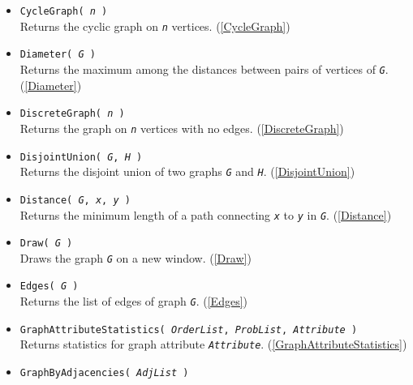\documentclass[a4paper,11pt]{report}
\begin{document}
{{\begin{itemize}
 Returns the equivalence partition of $V(G)$ corresponding to the equivalence relation ``reachable'' in \mbox{\texttt{\mdseries\slshape G}}. (\ref{ConnectedComponents}) 
\item \texttt{CycleGraph( \mbox{\texttt{\mdseries\slshape n}} )}\\
 Returns the cyclic graph on \mbox{\texttt{\mdseries\slshape n}} vertices. (\ref{CycleGraph}) 
\item \texttt{Diameter( \mbox{\texttt{\mdseries\slshape G}} )}\\
 Returns the maximum among the distances between pairs of vertices of \mbox{\texttt{\mdseries\slshape G}}. (\ref{Diameter}) 
\item \texttt{DiscreteGraph( \mbox{\texttt{\mdseries\slshape n}} )}\\
 Returns the graph on \mbox{\texttt{\mdseries\slshape n}} vertices with no edges. (\ref{DiscreteGraph}) 
\item \texttt{DisjointUnion( \mbox{\texttt{\mdseries\slshape G}}, \mbox{\texttt{\mdseries\slshape H}} )}\\
 Returns the disjoint union of two graphs \mbox{\texttt{\mdseries\slshape G}} and \mbox{\texttt{\mdseries\slshape H}}. (\ref{DisjointUnion}) 
\item \texttt{Distance( \mbox{\texttt{\mdseries\slshape G}}, \mbox{\texttt{\mdseries\slshape x}}, \mbox{\texttt{\mdseries\slshape y}} )}\\
 Returns the minimum length of a path connecting \mbox{\texttt{\mdseries\slshape x}} to \mbox{\texttt{\mdseries\slshape y}} in \mbox{\texttt{\mdseries\slshape G}}. (\ref{Distance}) 
\item \texttt{Draw( \mbox{\texttt{\mdseries\slshape G}} )}\\
 Draws the graph \mbox{\texttt{\mdseries\slshape G}} on a new window. (\ref{Draw}) 
\item \texttt{Edges( \mbox{\texttt{\mdseries\slshape G}} )}\\
 Returns the list of edges of graph \mbox{\texttt{\mdseries\slshape G}}. (\ref{Edges}) 
\item \texttt{GraphAttributeStatistics( \mbox{\texttt{\mdseries\slshape OrderList}}, \mbox{\texttt{\mdseries\slshape ProbList}}, \mbox{\texttt{\mdseries\slshape Attribute}} )}\\
 Returns statistics for graph attribute \mbox{\texttt{\mdseries\slshape Attribute}}. (\ref{GraphAttributeStatistics}) 
\item \texttt{GraphByAdjacencies( \mbox{\texttt{\mdseries\slshape AdjList}} )}\\

\end{itemize}}}
\end{document}
